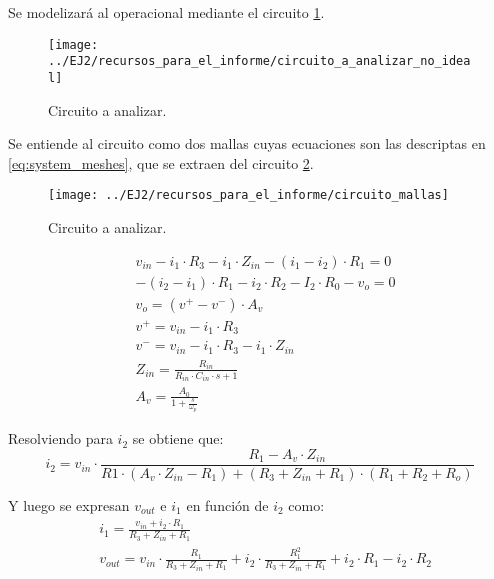 Se modelizará al operacional mediante el circuito \ref{fig:non_ideal_circuit}.
\begin{figure}[H]
    \begin{minipage}{\textwidth}
        \centering
        \texttt{[image: ../EJ2/recursos\_para\_el\_informe/circuito\_a\_analizar\_no\_ideal]}
        \caption{Circuito a analizar.}
        \label{fig:non_ideal_circuit}
    \end{minipage}\hfill
\end{figure}

Se entiende al circuito como dos mallas cuyas ecuaciones son las descriptas en \ref{eq:system_meshes}, que se extraen del circuito \ref{fig:meshes_circuit}.
\begin{figure}[H]
    \begin{minipage}{\textwidth}
        \centering
        \texttt{[image: ../EJ2/recursos\_para\_el\_informe/circuito\_mallas]}
        \caption{Circuito a analizar.}
        \label{fig:meshes_circuit}
    \end{minipage}\hfill
\end{figure}

\begin{align}
    \label{eq:system_meshes}
    &v_{in} - i_1 \cdot R_3 - i_1 \cdot Z_{in} - \left(i_1 - i_2\right) \cdot R_1 = 0 \\
    &-\left(i_2 - i_1\right) \cdot R_1 - i_2 \cdot R_2 - I_2 \cdot R_0 - v_o = 0 \\
    &v_o = \left(v^+ - v^-\right) \cdot A_v \\
    &v^+ = v_{in} - i_1 \cdot R_3 \\
    &v^- = v_{in} - i_1 \cdot R_3 - i_1 \cdot Z_{in} \\
    &Z_{in} = \frac{R_{in}}{R_{in} \cdot C_{in} \cdot s + 1} \label{eq:zin} \\
    &A_v = \frac{A_0}{1+\frac{s}{\omega_p}}
\end{align}

Resolviendo para $i_2$ se obtiene que:
\begin{equation}
    i_2 = v_{in} \cdot \frac{R_1 - A_v \cdot Z_{in}}{R1 \cdot \left(A_v \cdot Z_{in} - R_1\right) + \left(R_3 + Z_{in} + R_1\right) \cdot \left(R_1 + R_2 + R_o\right)}
    \label{eq:i2}
\end{equation}

Y luego se expresan $v_{out}$ e $i_1$ en función de $i_2$ como:
\begin{align}
    \label{eq:i1_and_vout}
    &i_1 = \frac{v_{in} + i_2 \cdot R_1}{R_3 + Z_{in} + R_1} \\
    &v_{out} = v_{in} \cdot \frac{R_1}{R_3 + Z_{in} + R_1} + i_2 \cdot \frac{R_1^2}{R_3 + Z_{in} + R_1} + i_2 \cdot R_1 - i_2 \cdot R_2
\end{align}

